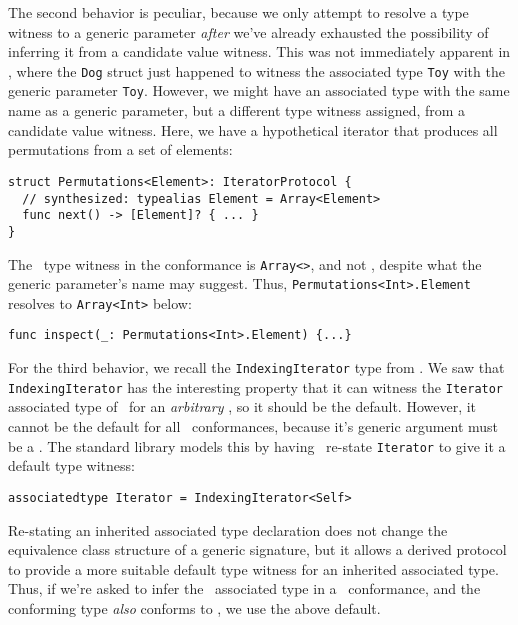 \documentclass[../generics]{subfiles}
\begin{document}
\begin{example}
The second behavior is peculiar, because we only attempt to resolve a type witness to a generic parameter \emph{after} we've already exhausted the possibility of inferring it from a candidate value witness. This was not immediately apparent in , where the \texttt{Dog} struct just happened to witness the associated type \texttt{Toy} with the generic parameter \texttt{Toy}. However, we might have an associated type with the same name as a generic parameter, but a different type witness assigned, from a candidate value witness. Here, we have a hypothetical iterator that produces all permutations from a set of elements:
\begin{Verbatim}
struct Permutations<Element>: IteratorProtocol {
  // synthesized: typealias Element = Array<Element>
  func next() -> [Element]? { ... }
}
\end{Verbatim}
The \nElement\ type witness in the conformance is \texttt{Array<\rT>}, and not \rT, despite what the generic parameter's name may suggest. Thus, \texttt{Permutations<Int>.Element} resolves to \texttt{Array<Int>} below:
\begin{Verbatim}
func inspect(_: Permutations<Int>.Element) {...}
\end{Verbatim}
\end{example}

\begin{example}
For the third behavior, we recall the \texttt{IndexingIterator} type from . We saw that \texttt{IndexingIterator} has the interesting property that it can witness the \texttt{Iterator} associated type of \tSequence\ for an \emph{arbitrary} \tCollection, so it should be the default. However, it cannot be the default for all \tSequence\ conformances, because it's generic argument must be a \tCollection. The standard library models this by having \tCollection\ re-state \texttt{Iterator} to give it a default type witness:
\begin{Verbatim}
associatedtype Iterator = IndexingIterator<Self>
\end{Verbatim}
Re-stating an inherited associated type declaration does not change the equivalence class structure of a generic signature, but it allows a derived protocol to provide a more suitable default type witness for an inherited associated type. Thus, if we're asked to infer the \nIterator\ associated type in a \tSequence\ conformance, and the conforming type \emph{also} conforms to \tCollection, we use the above default.
\end{example}
\end{document}
